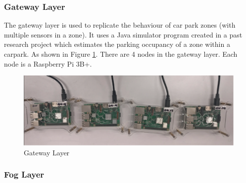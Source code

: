     
\subsubsection{Gateway Layer}     
    \begin{flushleft}
        The gateway layer  is used to replicate the behaviour of  car park zones (with multiple sensors in a zone). It uses a Java simulator program created in a past research project which estimates the parking occupancy of a zone within a carpark. As shown in Figure \ref{fig:Gateway Layer}. There are 4 nodes in the gateway layer. Each node is a Raspberry Pi 3B+.
           
        \begin{figure}[H]
          
          \includegraphics[width=\textwidth]{images/GatewayLayer.png}
          \caption{Gateway Layer}
          \label{fig:Gateway Layer}
        \end{figure}
        
    \end{flushleft}

\subsubsection{Fog Layer} 
       

